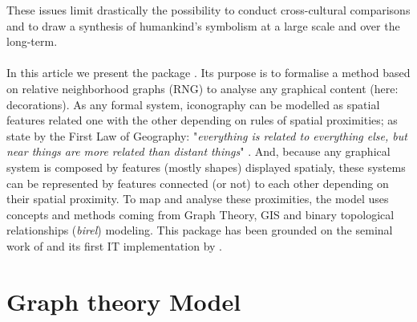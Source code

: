 \documentclass[article]{jss}\usepackage{knitr}
\begin{document}
These issues limit drastically the possibility to conduct cross-cultural comparisons and to draw a synthesis of humankind's symbolism at a large scale and over the long-term.  
\\
\\
In this article we present the  package . Its purpose is to formalise a method based on relative neighborhood graphs (RNG) to analyse any graphical content (here: decorations). As any formal system, iconography can be modelled as spatial features related one with the other depending on rules of spatial proximities; as state by the First Law of Geography: "\emph{everything is related to everything else, but near things are more related than distant things}" \citep{Tobler70}. And, because any graphical system is composed by features (mostly shapes) displayed spatialy, these systems can be represented by features connected (or not) to each other depending on their spatial proximity. To map and analyse these proximities, the model uses concepts and methods coming from Graph Theory, GIS and binary topological relationships (\emph{birel}) modeling. This package has been grounded on the seminal work of \citet{Alexander08} and its first IT implementation by \citet{Huet18a}. 

\section[Model]{Graph theory Model} \label{sec:model}
\end{document}
